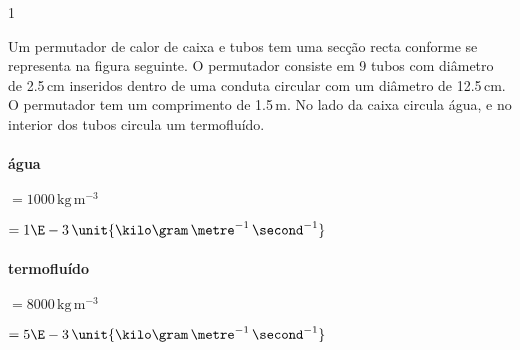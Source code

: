 \documentclass[\mainfilename]{subfiles}
\begin{document}
\begin{questionBox}1{} %
    
    Um permutador de calor de caixa e tubos tem uma secção recta conforme se representa na figura seguinte. O permutador consiste em 9 tubos com diâmetro de 2.5\,\unit{\centi\metre} inseridos dentro de uma conduta circular com um diâmetro de 12.5\,\unit{\centi\metre}. O permutador tem um comprimento de 1.5\,\unit{\metre}. No lado da caixa circula água, e no interior dos tubos circula um termofluído.

    \paragraph*{água}
    \begin{minipage}{.5\textwidth}
        \begin{description}
            \begin{multicols}{2}
                \item[\chemrho] \(= 1000\,\unit{\kilo\gram\,\metre^{-3}}\) 
                \item[\chemmu] \(= 1\E-3\,\unit{\kilo\gram\,\metre^{-1}\,\second^{-1}}\) 
            \end{multicols}
        \end{description}
    \end{minipage}

    \paragraph*{termofluído}
    \begin{minipage}{.5\textwidth}
        \begin{description}
            \begin{multicols}{2}
                \item[\chemrho] \(=8000\,\unit{\kilo\gram\,\metre^{-3}}\) 
                \item[\chemmu] \(=5\E-3\,\unit{\kilo\gram\,\metre^{-1}\,\second^{-1}}\) 
            \end{multicols}
        \end{description}
    \end{minipage}

    
\end{questionBox}
\end{document}
